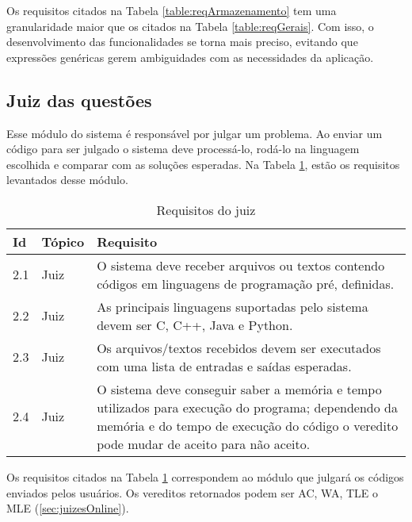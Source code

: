 Os requisitos citados na Tabela \ref{table:reqArmazenamento} tem uma granularidade maior que os citados na Tabela \ref{table:reqGerais}. Com isso, o desenvolvimento das funcionalidades se torna mais preciso, evitando que expressões genéricas gerem ambiguidades com as necessidades da aplicação.

\subsection{Juiz das questões}
\label{subsec:juiz}

Esse módulo do sistema é responsável por julgar um problema. Ao enviar um código para ser julgado o sistema deve processá-lo, rodá-lo na linguagem escolhida e comparar com as soluções esperadas. Na Tabela \ref{table:reqJuiz}, estão os requisitos levantados desse módulo.

\begin{table}[ht]
    \caption{Requisitos do juiz}
    \centering
    \label{table:reqJuiz}
    \begin{tabular}{ |p{0.6cm}|p{2cm}|p{11cm}|  }
        \hline
        
        \textbf{Id} & 
        \textbf{Tópico} & 
        \textbf{Requisito} \\
        \hline
        
        2.1 & 
        Juiz & 
        O sistema deve receber arquivos ou textos contendo códigos em linguagens de programação pré, definidas. \\ 
        \hline
        
        2.2 & 
        Juiz & 
        As principais linguagens suportadas pelo sistema devem ser C, C++, Java e Python.  \\
        \hline
        
        2.3 & 
        Juiz & 
        Os arquivos/textos recebidos devem ser executados com uma lista de entradas e saídas esperadas. \\
        \hline
        
        2.4 & 
        Juiz & 
        O sistema deve conseguir saber a memória e tempo utilizados para execução do programa; dependendo da memória e do tempo de execução do código o veredito pode mudar de aceito para não aceito. \\
        \hline
    \end{tabular}
\end{table}

Os requisitos citados na Tabela \ref{table:reqJuiz} correspondem ao módulo que julgará os códigos enviados pelos usuários. Os vereditos retornados podem ser AC, WA, TLE o MLE (\ref{sec:juizesOnline}).

